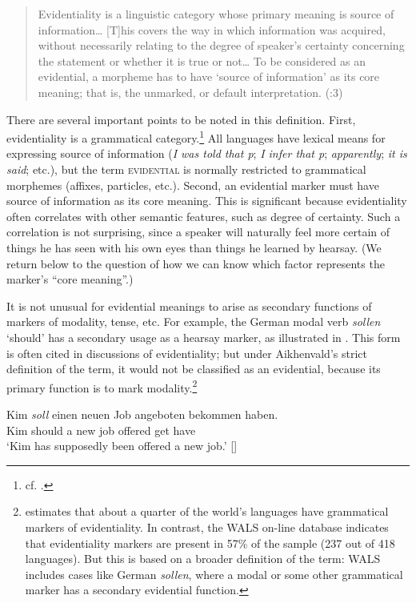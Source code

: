 \begin{quote}
Evidentiality is a linguistic category whose primary meaning is source of information… [T]his covers the way in which information was acquired, without necessarily relating to the degree of speaker’s certainty concerning the statement or whether it is true or not… To be considered as an evidential, a morpheme has to have ‘source of information’ as its core meaning; that is, the unmarked, or default interpretation.  (\citealt{Aikhenvald2004}:3)
\end{quote}


There are several important points to be noted in this definition. First, evidentiality is a grammatical category.\footnote{cf. \citet[1]{Aikhenvald2004}.} All languages have lexical means for expressing source of information (\textit{I was told that p}; \textit{I infer that p}; \textit{apparently}; \textit{it is said}; etc.), but the term \textsc{evidential} is normally restricted to grammatical morphemes (affixes, particles, etc.). Second, an evidential marker must have source of information as its core meaning. This is significant because evidentiality often correlates with other semantic features, such as degree of certainty. Such a correlation is not surprising, since a speaker will naturally feel more certain of things he has seen with his own eyes than things he learned by hearsay. (We return below to the question of how we can know which factor represents the marker’s “core meaning”.)



It is not unusual for evidential meanings to arise as secondary functions of markers of modality, tense, etc. For example, the German modal verb \textit{sollen} ‘should’ has a secondary usage as a hearsay marker, as illustrated in . This form is often cited in discussions of evidentiality; but under Aikhenvald’s strict definition of the term, it would not be classified as an evidential, because its primary function is to mark modality.\footnote{\citet[1]{Aikhenvald2004} estimates that about a quarter of the world’s languages have grammatical markers of evidentiality. In contrast, the WALS on-line database indicates that evidentiality markers are present in 57\% of the sample (237 out of 418 languages). But this is based on a broader definition of the term: WALS includes cases like German \textit{sollen}, where a modal or some other grammatical marker has a secondary evidential function.}


\ea
\gll Kim  \textit{soll}  einen  neuen  Job  angeboten  bekommen  haben.\\
Kim  should a  new  job  offered  get  have\\
\glt ‘Kim has supposedly been offered a new job.’  [\citealt{vonFintel2006}]
\z


